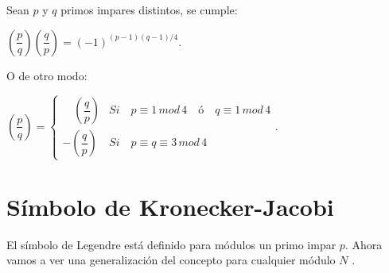 \begin{theorem}
	Sean $p$ y $q$ primos impares distintos, se cumple:
	
	\begin{center}
		$
	\left( \dfrac{p}{q} \right) 	\left( \dfrac{q}{p} \right) = \left( -1 \right) ^{(p-1)(q-1)/4}
	$.
	\end{center}
	O de otro modo:
	
	\begin{center}
		$
		\left({\dfrac p q}\right) = \begin{cases}
		\quad \left({\dfrac q p}\right) & Si\quad p \equiv 1 \, mod \, 4 \quad  ó \quad  q \equiv 1 \, mod \, 4 \\
		-\left({\dfrac q p}\right) & Si\quad p \equiv q \equiv 3 \, mod \, 4
		\end{cases}
		$.
	\end{center}
	
	\label{quadRec:theo}
	
	
\end{theorem}



\hfil

\section{Símbolo de Kronecker-Jacobi}


El símbolo de Legendre está definido para módulos un primo impar $p$. Ahora vamos a ver una generalización del concepto para cualquier módulo $N$ .

